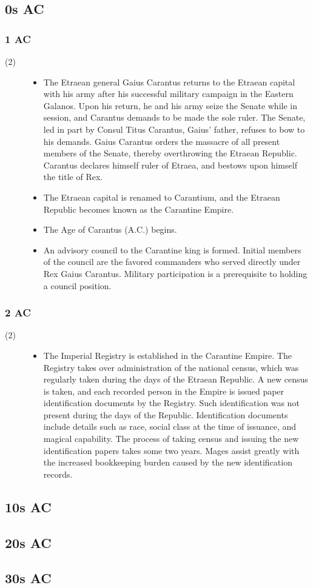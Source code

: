 \documentclass[a4paper, 11pt]{article}
\def\level#1{\item[(#1)\hspace{9.5pt}]}
\newenvironment{knowlevels}{\begin{description}}{\end{description}} %
\def\decadeblk#1{\subsection{#1}}
\def\yearblk#1{\subsubsection{#1}}
\begin{document}
\decadeblk{0s AC}
\yearblk{1 AC}
\begin{knowlevels}
\level{2} {
\begin{itemize}
\item The Etraean general Gaius Carantus returns to the Etraean capital with his army after his successful military campaign in the Eastern Galanos.  Upon his return, he and his army seize the Senate while in session, and Carantus demands to be made the sole ruler.  The Senate, led in part by Consul Titus Carantus, Gaius' father, refuses to bow to his demands.  Gaius Carantus orders the massacre of all present members of the Senate, thereby overthrowing the Etraean Republic.  Carantus declares himself ruler of Etraea, and bestows upon himself the title of Rex.

\item The Etraean capital is renamed to Carantium, and the Etraean Republic becomes known as the Carantine Empire.

\item The Age of Carantus (A.C.) begins.

\item An advisory council to the Carantine king is formed.  Initial members of the council are the favored commanders who served directly under Rex Gaius Carantus.  Military participation is a prerequisite to holding a council position.
\end{itemize}
}
\end{knowlevels}

\yearblk{2 AC}
\begin{knowlevels}
\level{2} {
\begin{itemize}
\item  The Imperial Registry is established in the Carantine Empire.  The Registry takes over administration of the national census, which was regularly taken during the days of the Etraean Republic.  A new census is taken, and each recorded person in the Empire is issued paper identification documents by the Registry.  Such identification was not present during the days of the Republic.  Identification documents include details such as race, social class at the time of issuance, and magical capability.  The process of taking census and issuing the new identification papers takes some two years.  Mages assist greatly with the increased bookkeeping burden caused by the new identification records.
\end{itemize}
}
\end{knowlevels}

\decadeblk{10s AC}
\decadeblk{20s AC}
\decadeblk{30s AC}
\end{document}
